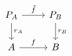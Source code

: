 \documentclass[12pt]{standalone}
\begin{document}
        $$

\begin{tikzcd}
    P_A \ar[r,"\tilde{f}"] \ar[d,"r_A"] & P_B \ar[d,"r_B"] \\
    A \ar[r,"f"] & B
\end{tikzcd}
        $$
        
\end{document}
